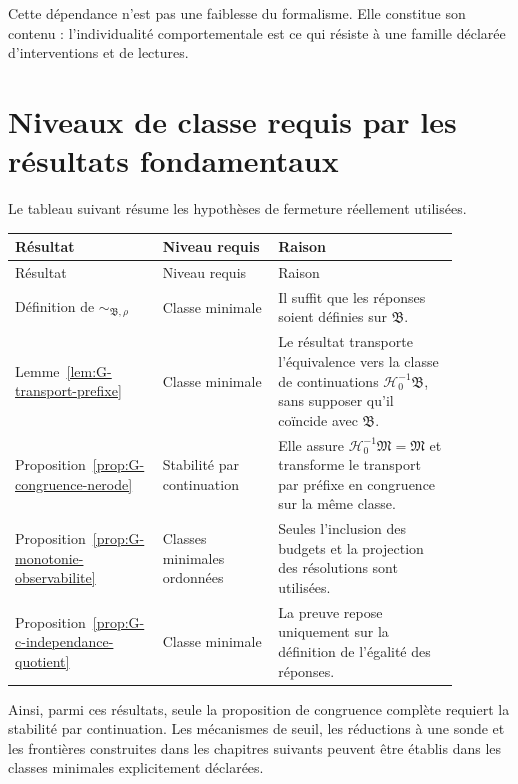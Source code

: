 Cette dépendance n'est pas une faiblesse du formalisme. Elle constitue
son contenu : l'individualité comportementale est ce qui résiste à une
famille déclarée d'interventions et de lectures.

\section{Niveaux de classe requis par les résultats fondamentaux}
\label{annexe-histoires-table-portee}

Le tableau suivant résume les hypothèses de fermeture réellement
utilisées.

\begin{center}
\begin{longtable}{p{0.24\linewidth}p{0.25\linewidth}p{0.39\linewidth}}
\toprule
Résultat & Niveau requis & Raison \\
\midrule
\endfirsthead
\toprule
Résultat & Niveau requis & Raison \\
\midrule
\endhead
Définition de
\(\sim_{\mathfrak B,\rho}\)
& Classe minimale
& Il suffit que les réponses soient définies sur
  \(\mathfrak B\). \\
\addlinespace
Lemme~\ref{lem:G-transport-prefixe}
& Classe minimale
& Le résultat transporte l'équivalence vers la classe de continuations
  \(\mathcal H_0^{-1}\mathfrak B\), sans supposer qu'il coïncide avec
  \(\mathfrak B\). \\
\addlinespace
Proposition~\ref{prop:G-congruence-nerode}
& Stabilité par continuation
& Elle assure
  \(\mathcal H_0^{-1}\mathfrak M=\mathfrak M\) et transforme le
  transport par préfixe en congruence sur la même classe. \\
\addlinespace
Proposition~\ref{prop:G-monotonie-observabilite}
& Classes minimales ordonnées
& Seules l'inclusion des budgets et la projection des résolutions sont
  utilisées. \\
\addlinespace
Proposition~\ref{prop:G-c-independance-quotient}
& Classe minimale
& La preuve repose uniquement sur la définition de l'égalité des
  réponses. \\
\bottomrule
\end{longtable}
\end{center}

Ainsi, parmi ces résultats, seule la proposition de congruence complète
requiert la stabilité par continuation. Les mécanismes de seuil, les
réductions à une sonde et les frontières construites dans les chapitres
suivants peuvent être établis dans les classes minimales explicitement
déclarées.


